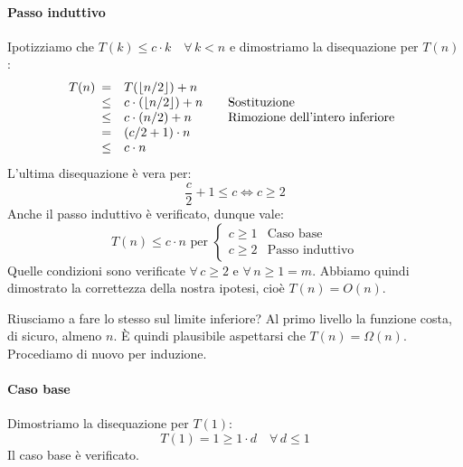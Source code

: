 \begin{eg}
    \paragraph{Passo induttivo} Ipotizziamo che $T(k)\leq c\cdot k\quad\forall\,k<n$
    e dimostriamo la disequazione per $T(n)$:
    \[T(n)\begin{array}[t]{cll}
        = & T(\lfloor n/2\rfloor)+n & \\
        \leq & c\cdot(\lfloor n/2\rfloor) + n & \quad\text{Sostituzione}\\
        \leq & c\cdot(n/2) + n & \quad\text{Rimozione dell'intero inferiore}\\
        = & (c/2 + 1)\cdot n\\
        \leq & c\cdot n
    \end{array}\]
    L'ultima disequazione è vera per:
    \[\frac{c}{2}+1\leq c\Leftrightarrow c\geq2\]
    Anche il passo induttivo è verificato, dunque vale:
    \[T(n)\leq c\cdot n\text{ per }\begin{cases}
        c\geq 1 & \text{Caso base}\\
        c\geq 2 & \text{Passo induttivo}
    \end{cases}\]
    Quelle condizioni sono verificate $\forall\,c\geq2$ e $\forall\,n\geq1=m$.
    Abbiamo quindi dimostrato la correttezza della nostra ipotesi, cioè $T(n)=O(n)$.

    \bigskip\noindent
    Riusciamo a fare lo stesso sul limite inferiore? Al primo livello
    la funzione costa, di sicuro, almeno $n$. È quindi plausibile aspettarsi che
    $T(n)=\Omega(n)$. Procediamo di nuovo per induzione.

    \paragraph{Caso base} Dimostriamo la disequazione per $T(1)$:
    \[T(1)=1\geq 1\cdot d\quad\forall\,d\leq1\]
    Il caso base è verificato.


\end{eg}
